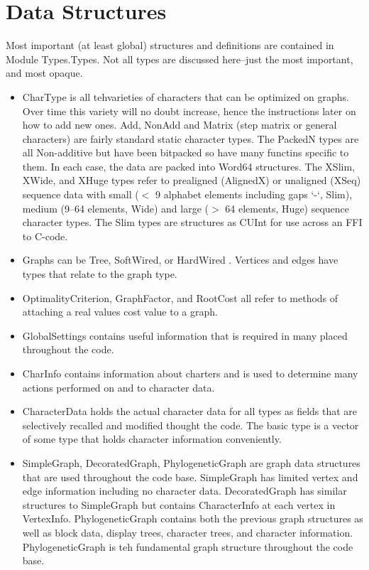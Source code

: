 \documentclass[11pt]{article}
\begin{document}
	\section{Data Structures}
	Most important (at least global) structures and definitions are contained in Module Types.Types.  Not all types are discussed here--just 
	the most important, and most opaque.
	
	\begin{itemize}
		\item {CharType is all tehvarieties of characters that can be optimized on graphs. Over time this variety will no doubt increase,
		hence the instructions later on how to add new ones. Add, NonAdd and Matrix (step matrix or general characters) are fairly standard 
		static character types.  The PackedN types are all Non-additive but have been bitpacked so have many functins specific to them.  In each case,
		the data are packed into Word64 structures. The XSlim, XWide, and XHuge types refer to prealigned (AlignedX) or unaligned (XSeq) sequence
		data with small ($<$ 9 alphabet elements including gaps `-`, Slim), medium (9--64 elements, Wide) and large ($>$ 64 elements, Huge) 
		sequence character types.  The Slim types are structures as CUInt for use across an FFI to C-code.}
	
		\item{Graphs can be Tree, SoftWired, or HardWired \cite{KannanandWheeler2012,Fischeretal2013, KannanandWheeler2014}.  Vertices and edges have types that relate to the graph type.}
		
		\item{OptimalityCriterion, GraphFactor, and RootCost all refer to methods of attaching a real values cost value to a graph.}
		
		\item{GlobalSettings contains useful information that is required in many placed throughout the code.}
		
		\item{CharInfo contains information about charters and is used to determine many actions performed on and to character data.}
		
		\item{CharacterData holds the actual character data for all types as fields that are selectively recalled and modified 
			thought the code. The basic type is a vector of some type that holds character information conveniently.}
		
		\item{SimpleGraph, DecoratedGraph, PhylogeneticGraph are graph data structures that are used throughout the code base.  
			SimpleGraph has limited vertex and edge information including no character data. DecoratedGraph has similar structures to 
			SimpleGraph but contains CharacterInfo at each vertex in VertexInfo. PhylogeneticGraph contains both the previous graph structures 
			as well as block data, display trees, character trees, and character information.  PhylogeneticGraph is teh fundamental graph structure
			throughout the code base.}
		

\end{itemize}
\end{document}
